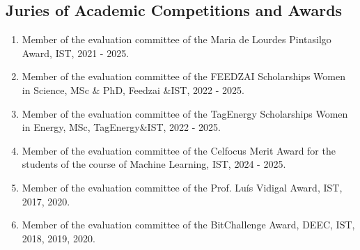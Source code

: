 \documentclass[
]{article}
\begin{document}
\subsection{Juries of Academic Competitions and
Awards}\label{juries-of-academic-competitions-and-awards}

\begin{enumerate}
\def\labelenumi{\arabic{enumi}.}
\item
  Member of the evaluation committee of the Maria de Lourdes Pintasilgo
  Award, IST, 2021 - 2025.
\item
  Member of the evaluation committee of the FEEDZAI Scholarships Women
  in Science, MSc \& PhD, Feedzai \&IST, 2022 - 2025.
\item
  Member of the evaluation committee of the TagEnergy Scholarships Women
  in Energy, MSc, TagEnergy\&IST, 2022 - 2025.
\item
  Member of the evaluation committee of the Celfocus Merit Award for the
  students of the course of Machine Learning, IST, 2024 - 2025.
\item
  Member of the evaluation committee of the Prof. Luís Vidigal Award,
  IST, 2017, 2020.
\item
  Member of the evaluation committee of the BitChallenge Award, DEEC,
  IST, 2018, 2019, 2020.
\end{enumerate}

\section*{}\label{section-1}
\end{document}
